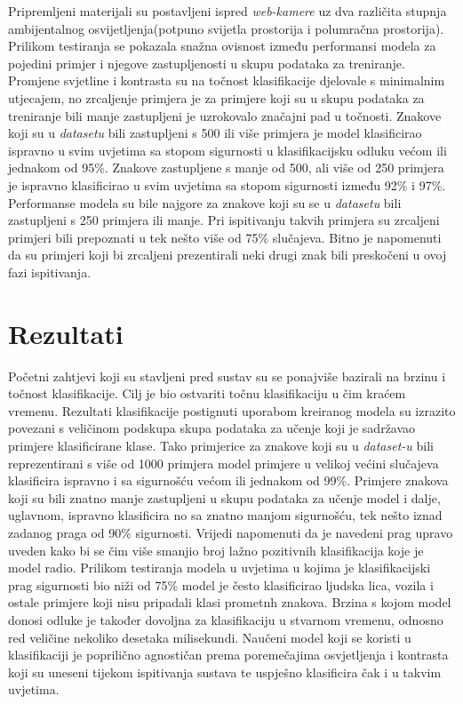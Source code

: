 \documentclass[times, utf8, zavrsni]{fer}
\begin{document}
Pripremljeni materijali su postavljeni ispred \emph{web-kamere} uz dva različita stupnja ambijentalnog osvijetljenja(potpuno svijetla prostorija i polumračna prostorija). Prilikom testiranja se pokazala snažna ovisnost između performansi modela za pojedini primjer i njegove zastupljenosti u skupu podataka za treniranje.
Promjene svjetline i kontrasta su na točnost klasifikacije djelovale s minimalnim utjecajem, no zrcaljenje primjera je za primjere koji su u skupu podataka za treniranje bili manje zastupljeni je uzrokovalo značajni pad u točnosti. Znakove koji su u \emph{datasetu} bili zastupljeni s 500 ili više primjera
je model klasificirao ispravno u svim uvjetima sa stopom sigurnosti u klasifikacijsku odluku većom ili jednakom od 95\%. Znakove zastupljene s manje od 500, ali više od 250 primjera je ispravno klasificirao u svim uvjetima sa stopom sigurnosti između 92\% i 97\%. Performanse modela su bile najgore za znakove koji su se u \emph{datasetu}
bili zastupljeni s 250 primjera ili manje. Pri ispitivanju takvih primjera su zrcaljeni primjeri bili prepoznati u tek nešto više od 75\% slučajeva. Bitno je napomenuti da su primjeri koji bi zrcaljeni prezentirali neki drugi znak bili preskočeni u ovoj fazi ispitivanja.

\chapter{Rezultati}
Početni zahtjevi koji su stavljeni pred sustav su se ponajviše bazirali na brzinu i točnost klasifikacije. Cilj je bio ostvariti točnu klasifikaciju u čim kraćem vremenu.
Rezultati klasifikacije postignuti uporabom kreiranog modela su izrazito povezani s veličinom podskupa skupa podataka za učenje koji je sadržavao primjere klasificirane klase. Tako primjerice za znakove koji su u \emph{dataset-u} bili reprezentirani s više od 1000 primjera model primjere 
u velikoj većini slučajeva klasificira ispravno i sa sigurnošću većom ili jednakom od 99\%. Primjere znakova koji su bili znatno manje zastupljeni u skupu podataka za učenje model i dalje, uglavnom, ispravno klasificira no sa znatno manjom sigurnošću, tek nešto iznad zadanog praga od 90\% sigurnosti.
Vrijedi napomenuti da je navedeni prag upravo uveden kako bi se čim više smanjio broj lažno pozitivnih klasifikacija koje je model radio. Prilikom testiranja modela u uvjetima u kojima je klasifikacijski prag sigurnosti bio niži od 75\% model je često klasificirao ljudska lica, vozila i ostale
primjere koji nisu pripadali klasi prometnh znakova. Brzina s kojom model donosi odluke je također dovoljna za klasifikaciju u stvarnom vremenu, odnosno red veličine nekoliko desetaka milisekundi.
Naučeni model koji se koristi u klasifikaciji je poprilično agnostičan prema poremečajima osvjetljenja i kontrasta koji su uneseni tijekom ispitivanja sustava te uspješno klasificira čak i u takvim uvjetima.
\end{document}
